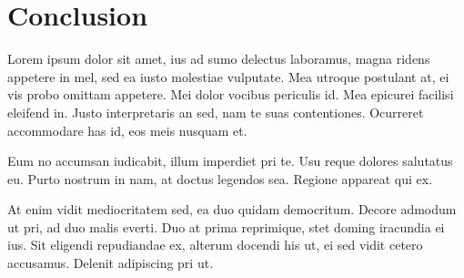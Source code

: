 \section{Conclusion}

Lorem ipsum dolor sit amet, ius ad sumo delectus laboramus, magna ridens appetere in mel, sed ea iusto molestiae vulputate. Mea utroque postulant at, ei vis probo omittam appetere. Mei dolor vocibus periculis id. Mea epicurei facilisi eleifend in. Justo interpretaris an sed, nam te suas contentiones. Ocurreret accommodare has id, eos meis nusquam et.

Eum no accumsan iudicabit, illum imperdiet pri te. Usu reque dolores salutatus eu. Purto nostrum in nam, at doctus legendos sea. Regione appareat qui ex.

At enim vidit mediocritatem sed, ea duo quidam democritum. Decore admodum ut pri, ad duo malis everti. Duo at prima reprimique, stet doming iracundia ei ius. Sit eligendi repudiandae ex, alterum docendi his ut, ei sed vidit cetero accusamus. Delenit adipiscing pri ut.